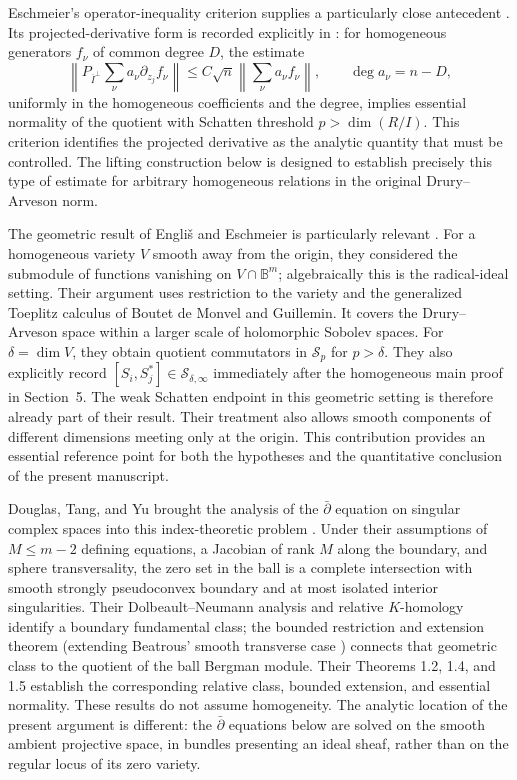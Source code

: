 \documentclass[11pt,reqno]{amsart}
\numberwithin{equation}{section}
\theoremstyle{definition}
\theoremstyle{remark}
\newcommand{\cS}{\mathcal S}
\begin{document}
Eschmeier's operator-inequality criterion supplies a particularly close
antecedent \cite{EschmeierCriterion}.  Its projected-derivative form is
recorded explicitly in \cite[Section~6, equation~(6.1)]{ShalitDivision}:
for homogeneous generators $f_\nu$ of common degree $D$, the estimate
\[
 \left\|P_{\overline I^\perp}\sum_\nu a_\nu\partial_{z_j}f_\nu\right\|
 \le C\sqrt n\left\|\sum_\nu a_\nu f_\nu\right\|,
 \qquad \deg a_\nu=n-D,
\]
uniformly in the homogeneous coefficients and the degree, implies
essential normality of the quotient with Schatten threshold
$p>\dim(R/I)$.  This criterion identifies the projected derivative as
the analytic quantity that must be controlled.  The lifting construction
below is designed to establish precisely this type of estimate for
arbitrary homogeneous relations in the original Drury--Arveson norm.

The geometric result of Engli\v{s} and Eschmeier is particularly relevant
\cite{EnglisEschmeier}.  For a homogeneous variety $V$ smooth away from
the origin, they considered the submodule of functions vanishing on
$V\cap\mathbb B^m$; algebraically this is the radical-ideal setting.
Their argument uses restriction to the variety and the generalized
Toeplitz calculus of Boutet de Monvel and Guillemin.  It covers the
Drury--Arveson space within a larger scale of holomorphic Sobolev spaces.
For $\delta=\dim V$, they obtain quotient commutators in $\cS_p$ for
$p>\delta$.  They also explicitly record
$[S_i,S_j^*]\in\cS_{\delta,\infty}$ immediately after the homogeneous
main proof in Section~5.  The weak Schatten endpoint in this geometric
setting is therefore already part of their result.  Their treatment
also allows smooth components of different dimensions meeting only at
the origin.  This contribution provides an essential reference point
for both the hypotheses and the quantitative conclusion of the present
manuscript.

Douglas, Tang, and Yu brought the analysis of the $\bar\partial$ equation
on singular complex spaces into this index-theoretic problem
\cite{DouglasTangYu}. Under their assumptions of $M\le m-2$ defining equations, a Jacobian of
rank $M$ along the boundary, and sphere transversality, the zero set in the ball is a complete
intersection with smooth strongly pseudoconvex boundary and at most
isolated interior singularities. Their Dolbeault--Neumann analysis and
relative $K$-homology identify a boundary fundamental class; the bounded
restriction and extension theorem (extending Beatrous' smooth transverse
case \cite{Beatrous}) connects that geometric class to the quotient of
the ball Bergman module. Their Theorems 1.2, 1.4, and 1.5 establish the
corresponding relative class, bounded extension, and essential normality.
These results do not assume homogeneity. The analytic location of the
present argument is different: the $\bar\partial$ equations below are
solved on the smooth ambient projective space, in bundles presenting an
ideal sheaf, rather than on the regular locus of its zero variety.
\end{document}
